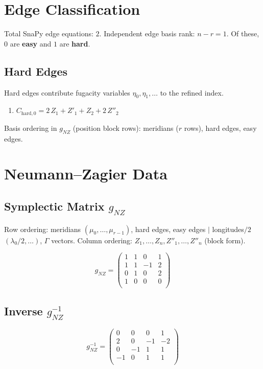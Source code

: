 \documentclass[11pt,a4paper]{article}
\begin{document}
\section{Edge Classification}
Total SnaPy edge equations: $2$.
Independent edge basis rank: $n - r = 1$.
Of these, $0$ are \textbf{easy} and $1$ are \textbf{hard}.

\subsection{Hard Edges}
Hard edges contribute fugacity variables $\eta_0, \eta_1, \ldots$ to the refined index.
\begin{enumerate}
  \item $C_{\text{hard},0} = 2\,Z_{1} + Z'_{1} + Z_{2} + 2\,Z''_{2}$
\end{enumerate}

Basis ordering in $g_{NZ}$ (position block rows): meridians ($r$ rows), hard edges, easy edges.

\section{Neumann--Zagier Data}
\subsection{Symplectic Matrix $g_{NZ}$}
Row ordering: meridians $(\mu_0,\ldots,\mu_{r-1})$, hard edges, easy edges $\mid$ longitudes$/2$ $(\lambda_0/2,\ldots)$, $\Gamma$ vectors.
Column ordering: $Z_1,\ldots,Z_n, Z''_1,\ldots,Z''_n$ (block form).

$$
g_{NZ} = 
\begin{pmatrix}
1 & 1 & 0 & 1 \\
1 & 1 & -1 & 2 \\
0 & 1 & 0 & 2 \\
1 & 0 & 0 & 0 \\
\end{pmatrix}
$$

\subsection{Inverse $g_{NZ}^{-1}$}
$$
g_{NZ}^{-1} = 
\begin{pmatrix}
0 & 0 & 0 & 1 \\
2 & 0 & -1 & -2 \\
0 & -1 & 1 & 1 \\
-1 & 0 & 1 & 1 \\
\end{pmatrix}
$$
\end{document}
